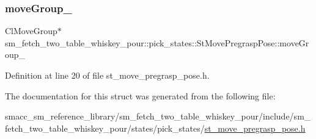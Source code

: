 \subsubsection{\texorpdfstring{move\+Group\+\_\+}{moveGroup\_}}
{\footnotesize\ttfamily Cl\+Move\+Group$\ast$ sm\+\_\+fetch\+\_\+two\+\_\+table\+\_\+whiskey\+\_\+pour\+::pick\+\_\+states\+::\+St\+Move\+Pregrasp\+Pose\+::move\+Group\+\_\+}



Definition at line 20 of file st\+\_\+move\+\_\+pregrasp\+\_\+pose.\+h.



The documentation for this struct was generated from the following file\+:\begin{DoxyCompactItemize}
\item 
smacc\+\_\+sm\+\_\+reference\+\_\+library/sm\+\_\+fetch\+\_\+two\+\_\+table\+\_\+whiskey\+\_\+pour/include/sm\+\_\+fetch\+\_\+two\+\_\+table\+\_\+whiskey\+\_\+pour/states/pick\+\_\+states/\hyperlink{sm__fetch__two__table__whiskey__pour_2include_2sm__fetch__two__table__whiskey__pour_2states_2pic8ca0cea8592d48b429ec5bfb897289c0}{st\+\_\+move\+\_\+pregrasp\+\_\+pose.\+h}\end{DoxyCompactItemize}
